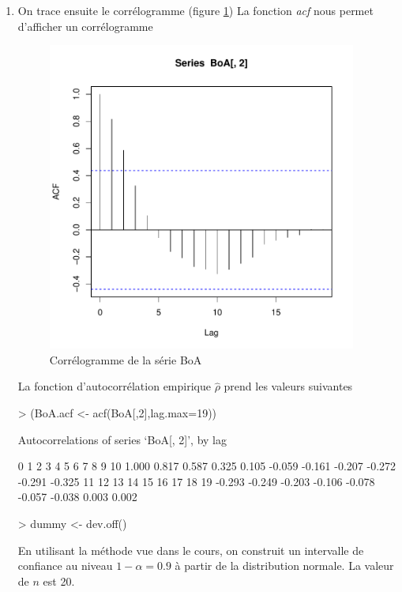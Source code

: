 \documentclass{article}
\begin{document}
\begin{enumerate}
\item 
  On trace ensuite le corrélogramme (figure \ref{fig:exercice1.6-graph1})
  La fonction \emph{acf} nous permet d'afficher un corrélogramme
\begin{figure}[p]
  \centering
  \includegraphics[height=4in, width=4in]{exercice1-6-graph1}
  \caption{Corrélogramme de la série BoA}
  \label{fig:exercice1.6-graph1}
\end{figure}

La fonction d'autocorrélation empirique $\hat{\rho}$ prend les valeurs suivantes
\begin{Schunk}
\begin{Sinput}
> (BoA.acf <- acf(BoA[,2],lag.max=19))
\end{Sinput}
\begin{Soutput}
Autocorrelations of series ‘BoA[, 2]’, by lag

     0      1      2      3      4      5      6      7      8      9     10 
 1.000  0.817  0.587  0.325  0.105 -0.059 -0.161 -0.207 -0.272 -0.291 -0.325 
    11     12     13     14     15     16     17     18     19 
-0.293 -0.249 -0.203 -0.106 -0.078 -0.057 -0.038  0.003  0.002 
\end{Soutput}
\begin{Sinput}
> dummy <- dev.off()
\end{Sinput}
\end{Schunk}

En utilisant la méthode vue dans le cours, on construit un intervalle de confiance au niveau $1-\alpha=0.9$ à partir de la distribution normale. La valeur de $n$ est 20.


\end{enumerate}
\end{document}
